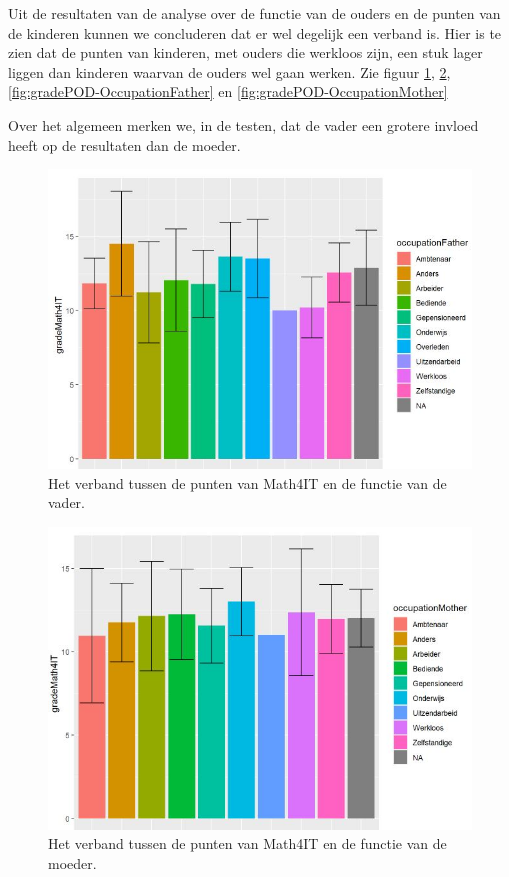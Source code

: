 \documentclass{hogent-article}
\begin{document}
Uit de resultaten van de analyse over de functie van de ouders en de punten van de kinderen kunnen we concluderen dat er wel degelijk een verband is. Hier is te zien dat de punten van kinderen, met ouders die werkloos zijn, een stuk lager liggen dan kinderen waarvan de ouders wel gaan werken. Zie figuur \ref{fig:gradeMath4IT-OccupationFather}, \ref{fig:gradeMath4IT-OccupationMother}, \ref{fig:gradePOD-OccupationFather} en \ref{fig:gradePOD-OccupationMother}

Over het algemeen merken we, in de testen, dat de vader een grotere invloed heeft op de resultaten dan de moeder.
\begin{figure}[h!]
    \includegraphics[width=\linewidth]{gradeMath4IT-OccupationFather.JPG}
    \caption{Het verband tussen de punten van Math4IT en de functie van de vader.}
    \label{fig:gradeMath4IT-OccupationFather}
\end{figure}
\begin{figure}[h!]
    \includegraphics[width=\linewidth]{gradeMath4IT-OccupationMother.JPG}
    \caption{Het verband tussen de punten van Math4IT en de functie van de moeder.}
    \label{fig:gradeMath4IT-OccupationMother}
\end{figure}
\end{document}
